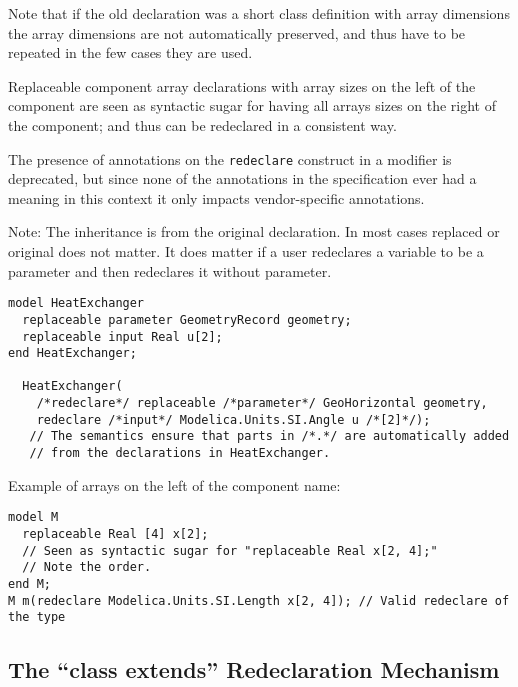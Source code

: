 Note that if the old declaration was a short class definition with array
dimensions the array dimensions are not automatically preserved, and
thus have to be repeated in the few cases they are used.

Replaceable component array declarations with array sizes on the left of
the component are seen as syntactic sugar for having all arrays sizes on
the right of the component; and thus can be redeclared in a consistent
way.

The presence of annotations on the \lstinline!redeclare! construct in a modifier is deprecated, but since none of the annotations in the specification ever had a meaning in this context it only impacts vendor-specific annotations.

\begin{nonnormative}
Note: The inheritance is from the original declaration. In most
cases replaced or original does not matter. It does matter if a user
redeclares a variable to be a parameter and then redeclares it without
parameter.
\end{nonnormative}

\begin{nonnormative}
\begin{lstlisting}[language=modelica]
model HeatExchanger
  replaceable parameter GeometryRecord geometry;
  replaceable input Real u[2];
end HeatExchanger;

  HeatExchanger(
    /*redeclare*/ replaceable /*parameter*/ GeoHorizontal geometry,
    redeclare /*input*/ Modelica.Units.SI.Angle u /*[2]*/);
   // The semantics ensure that parts in /*.*/ are automatically added
   // from the declarations in HeatExchanger.
\end{lstlisting}

Example of arrays on the left of the component name:
\begin{lstlisting}[language=modelica]
model M
  replaceable Real [4] x[2];
  // Seen as syntactic sugar for "replaceable Real x[2, 4];"
  // Note the order.
end M;
M m(redeclare Modelica.Units.SI.Length x[2, 4]); // Valid redeclare of the type
\end{lstlisting}
\end{nonnormative}

\subsection{The ``class extends'' Redeclaration Mechanism}\label{the-class-extends-redeclaration-mechanism}

